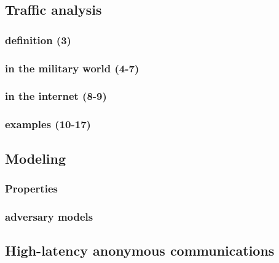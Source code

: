 \documentclass[../overview.tex]{subfiles}
\begin{document}
\subsection{Traffic analysis}
\subsubsection{definition (3)}
\subsubsection{in the military world (4-7)}
\subsubsection{in the internet (8-9)}
\subsubsection{examples (10-17)}

\subsection{Modeling}
\subsubsection{Properties}
\subsubsection{adversary models}

\subsection{High-latency anonymous communications}
\end{document}
